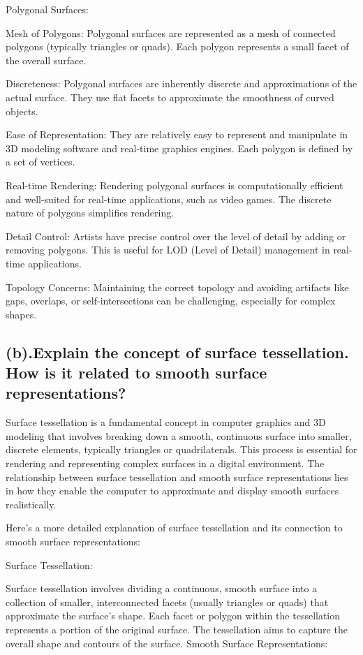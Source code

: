 \documentclass{article}
\begin{document}
\begin{itemize}
Polygonal Surfaces:

Mesh of Polygons: Polygonal surfaces are represented as a mesh of connected polygons (typically triangles or quads). Each polygon represents a small facet of the overall surface.

Discreteness: Polygonal surfaces are inherently discrete and approximations of the actual surface. They use flat facets to approximate the smoothness of curved objects.

Ease of Representation: They are relatively easy to represent and manipulate in 3D modeling software and real-time graphics engines. Each polygon is defined by a set of vertices.

Real-time Rendering: Rendering polygonal surfaces is computationally efficient and well-suited for real-time applications, such as video games. The discrete nature of polygons simplifies rendering.

Detail Control: Artists have precise control over the level of detail by adding or removing polygons. This is useful for LOD (Level of Detail) management in real-time applications.

Topology Concerns: Maintaining the correct topology and avoiding artifacts like gaps, overlaps, or self-intersections can be challenging, especially for complex shapes.
\subsection{(b).Explain the concept of surface tessellation. How is it related to smooth surface representations?}
Surface tessellation is a fundamental concept in computer graphics and 3D modeling that involves breaking down a smooth, continuous surface into smaller, discrete elements, typically triangles or quadrilaterals. This process is essential for rendering and representing complex surfaces in a digital environment. The relationship between surface tessellation and smooth surface representations lies in how they enable the computer to approximate and display smooth surfaces realistically.

Here's a more detailed explanation of surface tessellation and its connection to smooth surface representations:

Surface Tessellation:

Surface tessellation involves dividing a continuous, smooth surface into a collection of smaller, interconnected facets (usually triangles or quads) that approximate the surface's shape.
Each facet or polygon within the tessellation represents a portion of the original surface. The tessellation aims to capture the overall shape and contours of the surface.
Smooth Surface Representations:


\end{itemize}
\end{document}
